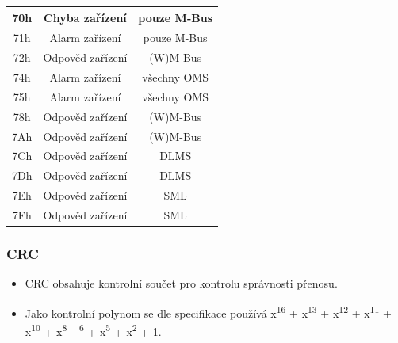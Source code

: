 \begin{table}[!ht]
\begin{tabular}{|c|c|c|}
70h               & Chyba zařízení                       & pouze M-Bus                    \\ \hline
71h               & Alarm zařízení                       & pouze M-Bus                    \\ \hline
72h               & Odpověd zařízení                     & (W)M-Bus                                              \\ \hline
74h               & Alarm zařízení                         & všechny OMS                                            \\ \hline
75h               & Alarm zařízení                         & všechny OMS                                            \\ \hline
78h               & Odpověd zařízení                   & (W)M-Bus                           \\ \hline
7Ah               & Odpověd zařízení                     & (W)M-Bus                                              \\ \hline
7Ch               & Odpověd zařízení                    & DLMS                                          \\ \hline
7Dh               & Odpověd zařízení                     & DLMS                                         \\ \hline
7Eh               & Odpověd zařízení                     & SML                                           \\ \hline
7Fh               & Odpověd zařízení                     & SML                                           \\ \hline \hline
\end{tabular}
\vspace{-10pt}
\end{table}

\subsubsection{CRC}
\begin{itemize}
	\item CRC obsahuje kontrolní součet pro kontrolu správnosti přenosu. 
	\item Jako kontrolní polynom se dle specifikace používá x\textsuperscript{16} + x\textsuperscript{13} + x\textsuperscript{12} + x\textsuperscript{11} + x\textsuperscript{10} + x\textsuperscript{8} +\textsuperscript{6} + x\textsuperscript{5} + x\textsuperscript{2} + 1.
\end{itemize}

